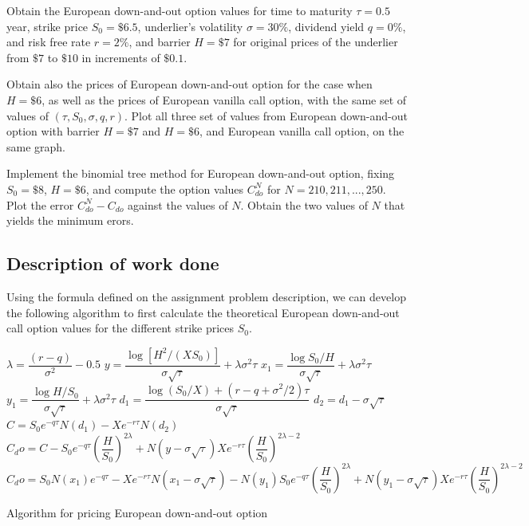 Obtain the European down-and-out option values for time to maturity $\tau = 0.5$ year, strike price $S_0 = \$6.5$, underlier's volatility $\sigma = 30\%$, dividend yield $q = 0\%$, and risk free rate $r = 2\%$, and barrier $H = \$7$ for original prices of the underlier from $\$7$ to $\$10$ in increments of $\$0.1$. 

Obtain also the prices of European down-and-out option for the case when $H = \$6$, as well as the prices of European vanilla call option, with the same set of values of $(\tau, S_0, \sigma, q, r)$. Plot all three set of values from European down-and-out option with barrier $H = \$7$ and $H = \$6$, and European vanilla call option, on the same graph.

Implement the binomial tree method for European down-and-out option, fixing $S_0 = \$8$, $H = \$6$, and compute the option values $C_{do}^{N}$ for $N = 210, 211,...,250$. Plot the error $C^{N}_{do} - C_{do}$ against the values of $N$. Obtain the two values of $N$ that yields the minimum erors.

\subsection{Description of work done}
Using the formula defined on the assignment problem description, we can develop the following algorithm to first calculate the theoretical European down-and-out call option values for the different strike prices $S_0$.

\begin{algorithm}[H]
 \label{theoretical-do}
 $\lambda = \dfrac{(r - q)}{\sigma ^ 2}- 0.5$\;
 $y = \dfrac{\log{[H ^ 2/(XS_0)]}}{\sigma\sqrt{\tau}} + \lambda\sigma^2\tau$\;
 $x_1 =\dfrac{\log{S_0/H}}{\sigma\sqrt{\tau}} + \lambda\sigma^2\tau$\;
 $y_1 =\dfrac{\log{H/S_0}}{\sigma\sqrt{\tau}} + \lambda\sigma^2\tau$\;
 $d_1 =\dfrac{\log{(S_0/X)} + (r-q+\sigma^2 / 2)\tau}{\sigma\sqrt{\tau}}$\;
 $d_2 = d_1 - \sigma\sqrt{\tau}$\;
 $C = S_0e^{-q\tau}N(d_1) - X e^{-r\tau}N(d_2)$\;
  {
    $C_do = C - S_0e^{-q\tau}\left(\dfrac{H}{S_0}\right)^{2\lambda}
      + N(y-\sigma\sqrt{\tau})Xe^{-r\tau}\left(\dfrac{H}{S_0}\right)^{2\lambda-2}$\;
  }{$C_do = S_0N(x_1)e^{-q\tau}
      - Xe^{-r\tau}N(x_1-\sigma\sqrt{\tau})
      - N(y_1)S_0e^{-q\tau}\left(\dfrac{H}{S_0}\right)^{2\lambda} 
      + N(y_1-\sigma\sqrt{\tau})Xe^{-r\tau}\left(\dfrac{H}{S_0}\right)^{2\lambda-2}$\;
  }
\caption{Algorithm for pricing European down-and-out option}
\end{algorithm}

